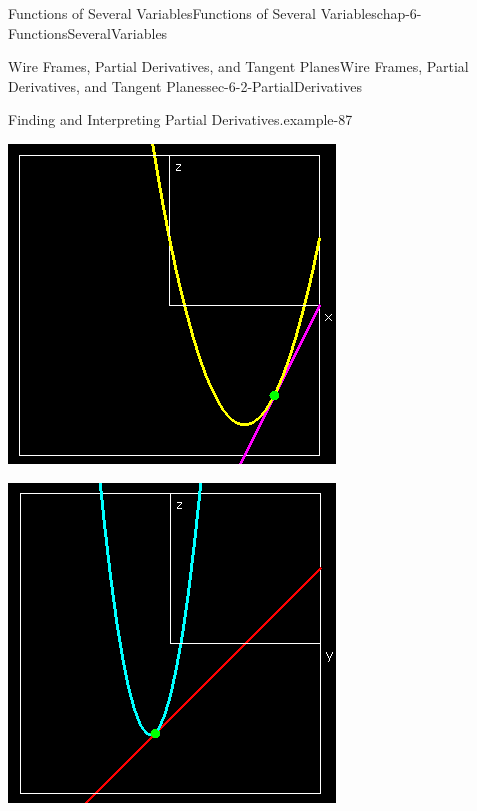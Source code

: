 \documentclass[oneside,10pt,]{book}
\numberwithin{equation}{section}
\begin{document}
\begin{chapterptx}{Functions of Several Variables}{}{Functions of Several Variables}{}{}{chap-6-FunctionsSeveralVariables}
\begin{sectionptx}{Wire Frames, Partial Derivatives, and Tangent Planes}{}{Wire Frames, Partial Derivatives, and Tangent Planes}{}{}{sec-6-2-PartialDerivatives}
\begin{example}{Finding and Interpreting Partial Derivatives.}{example-87}
\begin{sidebyside}{1}{0.3}{0.3}{0}
\begin{sbspanel}{0.4}
\includegraphics[width=1\linewidth]{images/sec-6-2-6.png}
\end{sbspanel}%
\end{sidebyside}%
\begin{sidebyside}{1}{0.3}{0.3}{0}%
\begin{sbspanel}{0.4}%
\includegraphics[width=1\linewidth]{images/sec-6-2-7.png}

\end{sbspanel}
\end{sidebyside}
\end{example}
\end{sectionptx}
\end{chapterptx}
\end{document}
